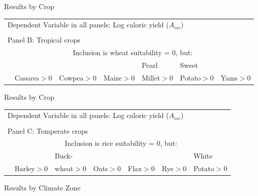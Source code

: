 \documentclass[10pt, xcolor=dvipsnames]{beamer}
\begin{document}
\begin{frame}{Results by Crop}

{\scriptsize
\begin{tabularx}{\textwidth}{lXXXXXX}
\midrule
\multicolumn{7}{l}{Dependent Variable in all panels: Log caloric yield ($A_{isc}$)} \\ \\
\multicolumn{7}{l}{Panel B: Tropical crops} \\
                   & \multicolumn{6}{c}{Inclusion is wheat suitability = 0, but:} \\ \cmidrule(lr){2-7}
                   &            &              &          &   Pearl       &  Sweet      & \\
& Cassava$>$0 & Cowpea$>$0  & Maize$>$0 & Millet$>$0 & Potato$>$0 & Yams$>$0   \\
\midrule

\midrule
\end{tabularx}
}

\end{frame}

\begin{frame}{Results by Crop}

{\scriptsize
\begin{tabularx}{\textwidth}{lXXXXXX}
\midrule
\multicolumn{7}{l}{Dependent Variable in all panels: Log caloric yield ($A_{isc}$)} \\ \\
\multicolumn{7}{l}{Panel C: Temperate crops} \\
                   & \multicolumn{6}{c}{Inclusion is rice suitability = 0, but:} \\ \cmidrule(lr){2-7}
                   &            & Buck-        &          &          &         & White \\
                   & Barley$>$0 & wheat$>$0  & Oats$>$0 & Flax$>$0 & Rye$>$0 & Potato$>$0   \\
\midrule

\midrule
\end{tabularx}
}
\end{frame}

\begin{frame}{Results by Climate Zone}

\end{frame}
\end{document}
